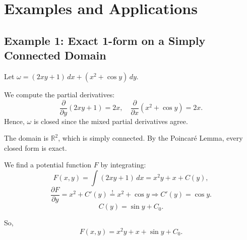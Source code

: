 \documentclass{amsart}
\theoremstyle{definition}
\theoremstyle{remark}
\numberwithin{equation}{section}
\begin{document}
\begin{table}[ht]
\centering
{}
\caption{Exactness of closed 1-forms on common manifolds and their topological invariants.}
\label{tab:exactness-topology}
\end{table}
\section{Examples and Applications}
\subsection*{Example 1: Exact 1-form on a Simply Connected Domain}
Let \( \omega = (2xy + 1)\,dx + (x^2 + \cos y)\,dy \). 

We compute the partial derivatives:
\[
\frac{\partial}{\partial y}(2xy + 1) = 2x, \quad \frac{\partial}{\partial x}(x^2 + \cos y) = 2x.
\]
Hence, \( \omega \) is closed since the mixed partial derivatives agree. 

The domain is \( \mathbb{R}^2 \), which is simply connected. By the Poincaré Lemma, every closed form is exact. 

We find a potential function \( F \) by integrating:
\[
F(x, y) = \int (2xy + 1)\,dx = x^2y + x + C(y),
\]
\[
\frac{\partial F}{\partial y} = x^2 + C'(y) \stackrel{!}{=} x^2 + \cos y \Rightarrow C'(y) = \cos y.
\]
\[
C(y) = \sin y + C_0.
\]

So,
\[
F(x, y) = x^2y + x + \sin y + C_0.
\]
\end{document}
